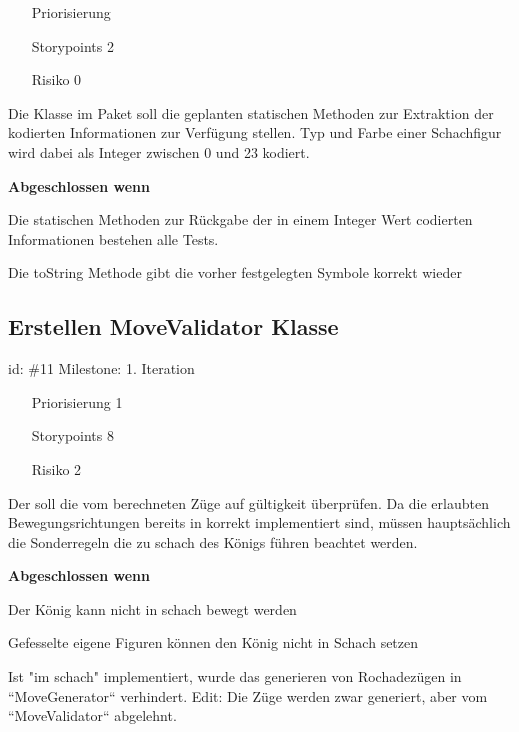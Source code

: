 \begin{itemize}
\item[Priorisierung] 
\item[Storypoints] 2
\item[Risiko] 0
\end{itemize}

Die Klasse im Paket  soll die geplanten statischen Methoden zur Extraktion der kodierten Informationen zur Verfügung stellen. Typ und Farbe einer Schachfigur wird dabei als Integer zwischen 0 und 23 kodiert.

\textbf{Abgeschlossen wenn}
\begin{todolist}
    \item[\done]  Die statischen Methoden zur Rückgabe der in einem Integer Wert codierten Informationen bestehen alle Tests.
  \item[\done]  Die toString Methode gibt die vorher festgelegten Symbole korrekt wieder

\end{todolist}

\subsection*{Erstellen MoveValidator Klasse}
id: \#11 Milestone: 1. Iteration\\

\begin{itemize}
\item[Priorisierung] 1
\item[Storypoints] 8
\item[Risiko] 2
\end{itemize}

Der  soll die vom  berechneten Züge auf gültigkeit überprüfen. Da die erlaubten Bewegungsrichtungen bereits in  korrekt implementiert sind, müssen hauptsächlich die Sonderregeln die zu schach des Königs führen beachtet werden. 

\textbf{Abgeschlossen wenn}
\begin{todolist}
    \item[\done]  Der König kann nicht in schach bewegt werden
  \item[\done]  Gefesselte eigene Figuren können den König nicht in Schach setzen
  \item[\done]  Ist "im schach" implementiert, wurde das generieren von Rochadezügen in ``MoveGenerator`` verhindert. Edit: Die Züge werden zwar generiert, aber vom ``MoveValidator`` abgelehnt.

\end{todolist}

